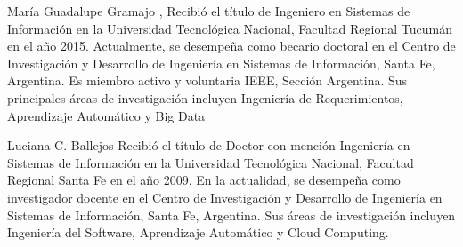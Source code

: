 \documentclass[journal]{IEEEtran}
\begin{document}
\normalsize
\twocolumn



% 

\begin{IEEEbiography}{María Guadalupe Gramajo}
 , Recibió el título de Ingeniero en Sistemas de Información en la Universidad Tecnológica Nacional, Facultad Regional Tucumán en el año 2015. Actualmente, se desempeña como becario doctoral en el Centro de Investigación y Desarrollo de Ingeniería en Sistemas de Información, Santa Fe, Argentina. Es miembro activo y voluntaria IEEE, Sección Argentina. Sus principales áreas de investigación incluyen Ingeniería de Requerimientos, Aprendizaje Automático y Big Data
\end{IEEEbiography}
\begin{IEEEbiography}{Luciana C. Ballejos}
  Recibió el título de Doctor con mención Ingeniería en Sistemas de Información en la Universidad Tecnológica Nacional, Facultad Regional Santa Fe en el año 2009. En la actualidad, se desempeña como investigador docente en el Centro de Investigación y Desarrollo de Ingeniería en Sistemas de Información, Santa Fe, Argentina. Sus áreas de investigación incluyen Ingeniería del Software, Aprendizaje Automático y Cloud Computing.
\end{IEEEbiography}
\end{document}

